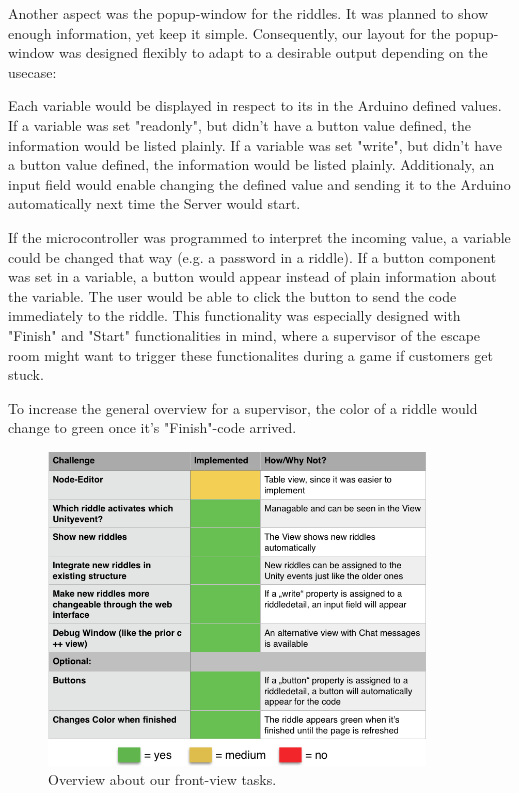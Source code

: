 Another aspect was the popup-window for the riddles. It was planned to show enough information, yet keep it simple.
Consequently, our layout for the popup-window was designed flexibly to adapt to a desirable output depending on the usecase:

Each variable would be displayed in respect to its in the Arduino defined values.
If a variable was set "readonly", but didn't have a button value defined, the information would be listed plainly.
If a variable was set "write", but didn't have a button value defined, the information would be listed plainly.
Additionaly, an input field would enable changing the defined value and sending it to the Arduino automatically next time the Server would start.

If the microcontroller was programmed to interpret the incoming value, a variable could be changed that way (e.g. a password in a riddle).
If a button component was set in a variable, a button would appear instead of plain information about the variable.
The user would be able to click the button to send the code immediately to the riddle.
This functionality was especially designed with "Finish" and "Start" functionalities in mind, where a supervisor of the escape room might want to trigger these functionalites during a game if customers get stuck.

To increase the general overview for a supervisor, the color of a riddle would change to green once it's "Finish"-code arrived.

\begin{figure}[th]
	\centering
	\includegraphics[width=100mm,scale=1]{Figures/frontendOverview}
	\decoRule
	\caption[FrontViewTable]{Overview about our front-view tasks.}
	\label{fig:FrontViewTable}
\end{figure}



